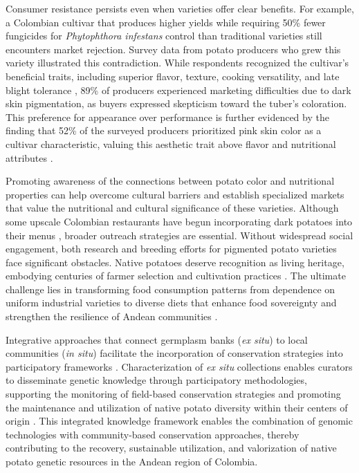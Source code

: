 \documentclass[pdflatex,sn-mathphys-ay]{sn-jnl}%
\begin{document}
Consumer resistance persists even when varieties offer clear benefits. For example, a Colombian cultivar that produces higher yields while requiring 50\% fewer fungicides for \textit{Phytophthora infestans} control than traditional varieties still encounters market rejection. Survey data from potato producers who grew this variety illustrated this contradiction. While respondents recognized the cultivar's beneficial traits, including superior flavor, texture, cooking versatility, and late blight tolerance \citep{sanchez2021plan}, 89\% of producers experienced marketing difficulties due to dark skin pigmentation, as buyers expressed skepticism toward the tuber's coloration. This preference for appearance over performance is further evidenced by the finding that 52\% of the surveyed producers prioritized pink skin color as a cultivar characteristic, valuing this aesthetic trait above flavor and nutritional attributes \citep{rodriguez2023estrategia}.

Promoting awareness of the connections between potato color and nutritional properties can help overcome cultural barriers and establish specialized markets that value the nutritional and cultural significance of these varieties. Although some upscale Colombian restaurants have begun incorporating dark potatoes into their menus \citep{RadioNacional2022}, broader outreach strategies are essential. Without widespread social engagement, both research and breeding efforts for pigmented potato varieties face significant obstacles. Native potatoes deserve recognition as living heritage, embodying centuries of farmer selection and cultivation practices \citep{arcespatial,luttringhaus2021dynamic}. The ultimate challenge lies in transforming food consumption patterns from dependence on uniform industrial varieties to diverse diets that enhance food sovereignty and strengthen the resilience of Andean communities \citep{dawson2023identifying}.


Integrative approaches that connect germplasm banks (\textit{ex situ}) to local communities (\textit{in situ}) facilitate the incorporation of conservation strategies into participatory frameworks \citep{luttringhaus2021dynamic}. Characterization of \textit{ex situ} collections enables curators to disseminate genetic knowledge through participatory methodologies, supporting the monitoring of field-based conservation strategies and promoting the maintenance and utilization of native potato diversity within their centers of origin \citep{arcespatial,dawson2023identifying}. This integrated knowledge framework enables the combination of genomic technologies with community-based conservation approaches, thereby contributing to the recovery, sustainable utilization, and valorization of native potato genetic resources in the Andean region of Colombia.
\end{document}
